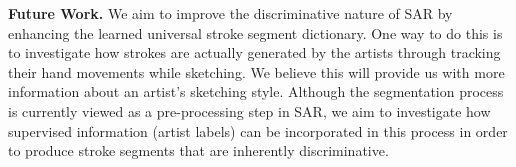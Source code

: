 \textbf{Future Work.} We aim to improve the discriminative nature of SAR by enhancing the learned universal stroke segment dictionary. One way to do this is to investigate how strokes are actually generated by the artists through tracking their hand movements while sketching. We believe this will provide us with more information about an artist's sketching style. Although the segmentation process is currently viewed as a pre-processing step in SAR, we aim to investigate how supervised information (artist labels) can be incorporated in this process in order to produce stroke segments that are inherently discriminative.





